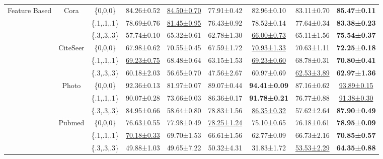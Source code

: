 \documentclass[sigconf, anonymous, review]{acmart}
\begin{document}
\begin{table}
{\begin{tabular}{ccccccccc}
    \multirow{12}{*}{Feature Based} & \multirow{3}{*}{Cora} &\{0,0,0\}&84.26±0.52 &\underline{84.50±0.70}&77.91±0.42&82.96±0.10&83.11±0.70 &\textbf{85.47±0.11}  \\
    &  &\{.1,.1,.1\}&78.69±0.76 &\underline{81.45±0.95}&76.43±0.92&78.52±0.14&77.64±0.34 &\textbf{83.38±0.23}  \\
    &  &\{.3,.3,.3\}&57.74±0.10&65.32±0.61&62.78±1.30&\underline{66.00±0.73}&65.11±1.56&\textbf{75.54±0.37}\\
    & \multirow{3}{*}{CiteSeer} &\{0,0,0\}&67.98±0.62 &70.55±0.45&67.59±1.72&\underline{70.93±1.33}&70.63±1.11 & \textbf{72.25±0.18} \\
    &  &\{.1,.1,.1\}&\underline{69.23±0.75}&68.48±0.64&63.15±1.53&\underline{69.23±0.60}&68.78±0.31&\textbf{70.80±0.41}\\
    &  &\{.3,.3,.3\}&60.18±2.03&56.65±0.70&47.56±2.67&60.97±0.69&\underline{62.53±3.89}&\textbf{62.97±1.36}\\
    & \multirow{3}{*}{Photo} &\{0,0,0\}&92.36±0.13&81.97±0.07&89.07±0.44&\textbf{94.41±0.09}&87.16±0.62&\underline{93.89±0.15}\\
    &  &\{.1,.1,.1\}&90.07±0.28 &73.66±0.03&86.36±0.17&\textbf{91.78±0.21}&76.77±0.88 &\underline{91.38±0.30}  \\
    &  &\{.3,.3,.3\}&84.95±0.66&58.64±0.80&78.83±1.56&\underline{86.35±0.32}&57.62±2.64&\textbf{87.90±0.49}\\
    & \multirow{3}{*}{Pubmed} &\{0,0,0\}&76.63±0.55&77.98±0.49&\underline{78.25±1.24}&75.10±0.65&76.18±0.61&\textbf{78.95±0.09}\\
    &  &\{.1,.1,.1\}&\underline{70.18±0.33}&69.70±1.53&66.61±1.56&62.77±0.09&66.73±2.16&\textbf{70.85±0.57}\\
    &  &\{.3,.3,.3\}& 49.88±1.03&49.65±7.22&50.32±4.31&31.83±1.72&\underline{53.53±2.29} &\textbf{64.35±0.88}\\
    

\end{tabular}}
\end{table}
\end{document}
